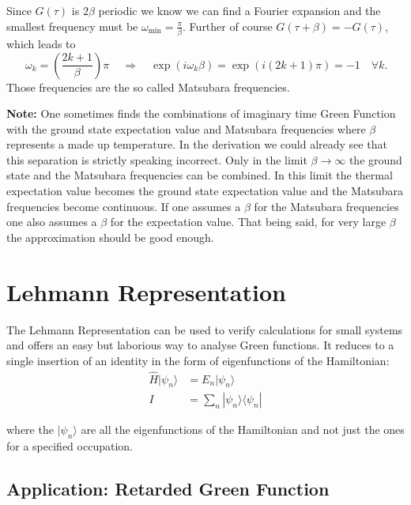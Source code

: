 Since $G(\tau)$ is $2\beta$ periodic we know we can find a Fourier expansion and the smallest frequency must be $\omega_{\min} = \frac{\pi}{\beta}$. Further of course $G(\tau+\beta) = -G(\tau)$, which leads to
\begin{equation*}
    \boxed{\,\omega_k = \left(\frac{2k+1}{\beta}\right)\pi\,} \quad \Rightarrow \quad \exp(i\omega_k \beta) = \exp(i(2k+1)\pi) = -1 \quad \forall k.
\end{equation*}
Those frequencies are the so called Matsubara frequencies.

\textbf{Note:}
One sometimes finds the combinations of imaginary time Green Function with the ground state expectation value and Matsubara frequencies where $\beta$ represents a made up temperature. 
In the derivation we could already see that this separation is strictly speaking incorrect. Only in the limit $\beta \to \infty$ the ground state and the Matsubara frequencies can be combined.
In this limit the thermal expectation value becomes the ground state expectation value and the Matsubara frequencies become continuous.
If one assumes a $\beta$ for the Matsubara frequencies one also assumes a $\beta$ for the expectation value. That being said, for very large $\beta$ the approximation should be good enough.

\section{Lehmann Representation}

The Lehmann Representation can be used to verify calculations for small systems and 
offers an easy but laborious way to analyse Green functions.
It reduces to a single insertion of an identity in the form of eigenfunctions of the Hamiltonian:
\begin{align*}
    \hat{H} |\psi_n\rangle &= E_n |\psi_n\rangle \\
    I &= \sum_n |\psi_n\rangle\langle\psi_n|
\end{align*}

where the $|\psi_n\rangle$ are all the eigenfunctions of the Hamiltonian and not just the ones for a specified occupation.

\subsection*{Application: Retarded Green Function}

